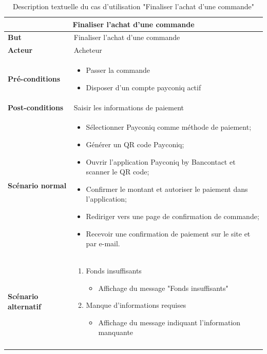 \begin{longtable}{|p{4cm}|p{11cm}|}
    \hline
    \multicolumn{2}{|c|}{\textbf{Finaliser l'achat d'une commande}} \\ \hline
    \textbf{But} & Finaliser l'achat d'une commande \\ \hline
    \textbf{Acteur} & Acheteur \\ \hline
    \textbf{Pré-conditions} & 
    \begin{itemize}
        \item Passer la commande
        \item Disposer d'un compte payconiq actif
    \end{itemize} \\ \hline
    \textbf{Post-conditions} & Saisir les informations de paiement \\ \hline
    \textbf{Scénario normal} &
    \begin{itemize}
        \item Sélectionner Payconiq comme méthode de paiement;
        \item Générer un QR code Payconiq;
        \item Ouvrir l'application Payconiq by Bancontact et scanner le QR code;
        \item Confirmer le montant et autoriser le paiement dans l'application;
        \item Rediriger vers une page de confirmation de commande;
        \item Recevoir une confirmation de paiement sur le site et par e-mail.
    \end{itemize} \\ \hline
    \textbf{Scénario alternatif} &
    \begin{enumerate}
        \item Fonds insuffisants
        \begin{itemize}
            \item Affichage du message "Fonds insuffisants"
        \end{itemize}
        \item Manque d'informations requises
        \begin{itemize}
            \item Affichage du message indiquant l'information manquante
        \end{itemize}
    \end{enumerate} \\ \hline
    \caption{Description textuelle du cas d'utilisation "Finaliser l'achat d'une commande"}
    \label{tab:finaliser_commande}
    \end{longtable}


